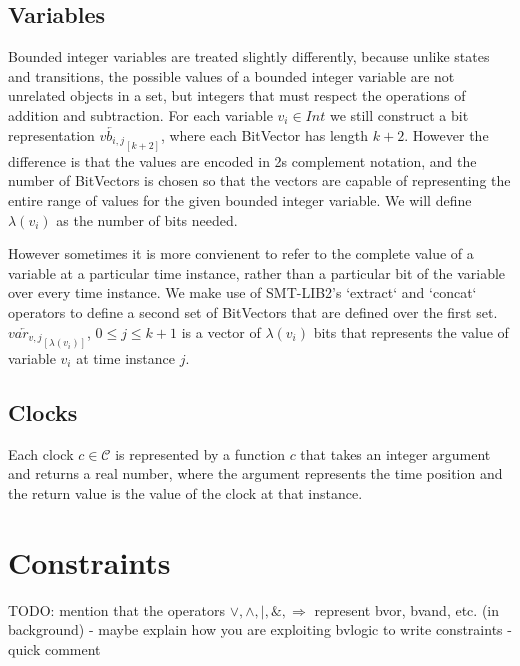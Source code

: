 \documentclass[a4paper,11pt]{article}
\newcommand*\BitAnd{\mathbin{\&}}
\newcommand*\BitOr{\mathbin{|}}
\begin{document}
\subsection{Variables}
\label{sec:org1ac0174}

Bounded integer variables are treated slightly differently, because unlike
states and transitions, the possible values of a bounded integer variable are
not unrelated objects in a set, but integers that must respect the operations of
addition and subtraction. For each variable \(v_i \in Int\) we still construct a
bit representation \(\overleftarrow{vb_{i,j}}_{[k+2]}\), where each BitVector
has length \(k+2\). However the difference is that the values are encoded in 2s
complement notation, and the number of BitVectors is chosen so that the vectors
are capable of representing the entire range of values for the given bounded
integer variable. We will define \(\lambda(v_i)\) as the number of bits needed.

However sometimes it is more convienent to refer to the complete value of a
variable at a particular time instance, rather than a particular bit of the
variable over every time instance. We make use of SMT-LIB2's `extract` and
`concat` operators to define a second set of BitVectors that are defined over
the first set. \(\overleftarrow{var_{v,j}}_{[\lambda(v_i)]}\), \(0 \leq j \leq
k+1\) is a vector of \(\lambda(v_i)\) bits that represents the value of variable
\(v_i\) at time instance \(j\).


\subsection{Clocks}
\label{sec:org34ead20}

Each clock \(c \in \mathcal{C}\) is represented by a function \(c\) that takes
an integer argument and returns a real number, where the argument represents the
time position and the return value is the value of the clock at that instance.

\section{Constraints}
\label{sec:org8c1472f}
TODO: mention that the operators \(\lor, \land, \BitOr , \BitAnd, \Rightarrow\) represent
bvor, bvand, etc. (in background) -  maybe explain how you are exploiting bvlogic to write constraints - quick comment
\end{document}

